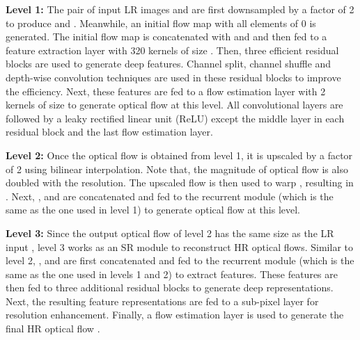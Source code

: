 \documentclass[journal]{IEEEtran}
\begin{document}
	\textbf{Level 1:} The pair of input LR images  and  are first downsampled by a factor of 2 to produce  and . Meanwhile, an initial flow map  with all elements of 0 is generated. The initial flow map  is concatenated with  and  and then fed to a feature extraction layer with 320 kernels of size . Then, three efficient residual blocks are used to generate deep features. Channel split, channel shuffle and depth-wise convolution techniques  \cite{Ma2018a} are used in these residual blocks to improve the efficiency. Next, these features are fed to a flow estimation layer with 2 kernels of size  to generate optical flow   at this level. All convolutional layers are followed by a leaky rectified linear unit (ReLU) except the middle layer in each residual block and the last flow estimation layer.
	
	\textbf{Level 2:} Once the optical flow 
	is obtained from level 1, it is upscaled by a factor
	of 2 using bilinear interpolation. Note that, the magnitude of optical flow is also doubled with the resolution. The upscaled flow  is then used to warp , resulting in . Next, ,  and  are concatenated and fed
	to the recurrent module (which is the same as the one used in level 1) to generate optical flow   at this level.
	
	\textbf{Level 3:} Since the output optical flow  of level 2 has the same size as the LR input , level 3 works as an SR module to reconstruct HR optical flows. Similar to level 2, ,  and  are first concatenated and fed to the recurrent module (which is the same as the one used in levels 1 and 2) to extract features. These features are then fed to three additional  residual blocks to generate deep representations. Next, the resulting feature representations are fed to a sub-pixel layer \cite{2016-RealTimeSingleImageandVideoSuperResolutionUsinganEfficientSubPixelConvolutionalNeuralNetwork-Shi-1874-1883}  for resolution enhancement. Finally, a flow estimation layer is used to generate the final HR optical flow .
	
\end{document}
